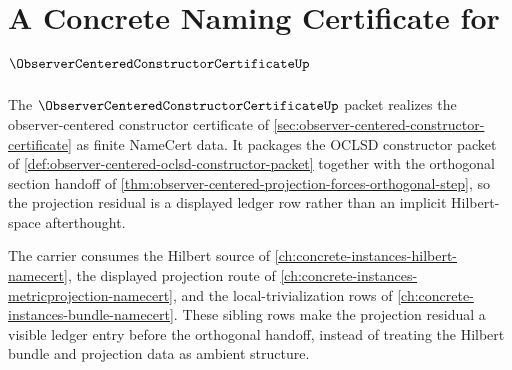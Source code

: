 \chapter{A Concrete Naming Certificate for $\ObserverCenteredConstructorCertificateUp$}
\label{ch:concrete-instances-observer-centered-constructor-certificate-namecert}

The $\ObserverCenteredConstructorCertificateUp$ packet realizes the observer-centered constructor certificate of \autoref{sec:observer-centered-constructor-certificate} as finite NameCert data. It packages the OCLSD constructor packet of \autoref{def:observer-centered-oclsd-constructor-packet} together with the orthogonal section handoff of \autoref{thm:observer-centered-projection-forces-orthogonal-step}, so the projection residual is a displayed ledger row rather than an implicit Hilbert-space afterthought.

The carrier consumes the Hilbert source of \autoref{ch:concrete-instances-hilbert-namecert}, the displayed projection route of \autoref{ch:concrete-instances-metricprojection-namecert}, and the local-trivialization rows of \autoref{ch:concrete-instances-bundle-namecert}. These sibling rows make the projection residual a visible ledger entry before the orthogonal handoff, instead of treating the Hilbert bundle and projection data as ambient structure.



